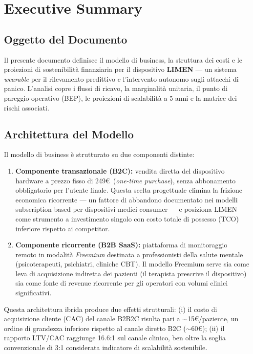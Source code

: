 \documentclass[12pt,a4paper]{article}
\begin{document}

\section{Executive Summary}

\subsection{Oggetto del Documento}
Il presente documento definisce il modello di business, la struttura dei costi e le proiezioni di sostenibilità finanziaria per il dispositivo \textbf{LIMEN} --- un sistema \textit{wearable} per il rilevamento predittivo e l'intervento autonomo sugli attacchi di panico. L'analisi copre i flussi di ricavo, la marginalità unitaria, il punto di pareggio operativo (BEP), le proiezioni di scalabilità a 5 anni e la matrice dei rischi associati.

\subsection{Architettura del Modello}
Il modello di business è strutturato su due componenti distinte:

\begin{enumerate}
    \item \textbf{Componente transazionale (B2C):} vendita diretta del dispositivo hardware a prezzo fisso di 249\euro\ (\textit{one-time purchase}), senza abbonamento obbligatorio per l'utente finale. Questa scelta progettuale elimina la frizione economica ricorrente --- un fattore di abbandono documentato nei modelli subscription-based per dispositivi medici consumer --- e posiziona LIMEN come strumento a investimento singolo con costo totale di possesso (TCO) inferiore rispetto ai competitor.

    \item \textbf{Componente ricorrente (B2B SaaS):} piattaforma di monitoraggio remoto in modalità \textit{Freemium} destinata a professionisti della salute mentale (psicoterapeuti, psichiatri, cliniche CBT). Il modello Freemium serve sia come leva di acquisizione indiretta dei pazienti (il terapista prescrive il dispositivo) sia come fonte di revenue ricorrente per gli operatori con volumi clinici significativi.
\end{enumerate}

Questa architettura ibrida produce due effetti strutturali: (i) il costo di acquisizione cliente (CAC) del canale B2B2C risulta pari a $\sim$15\euro/paziente, un ordine di grandezza inferiore rispetto al canale diretto B2C ($\sim$60\euro); (ii) il rapporto LTV/CAC raggiunge 16.6:1 sul canale clinico, ben oltre la soglia convenzionale di 3:1 considerata indicatore di scalabilità sostenibile.
\end{document}
